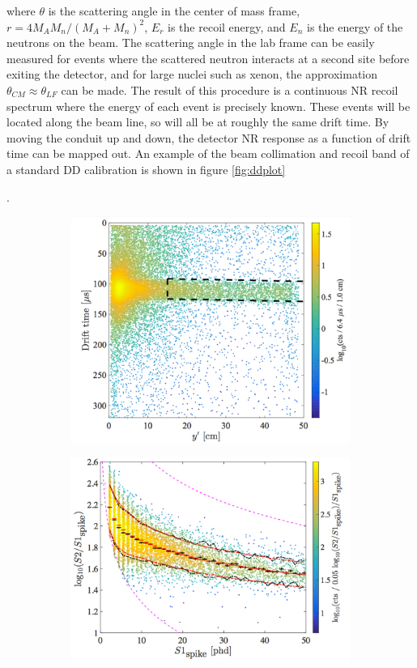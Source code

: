 where $\theta$ is the scattering angle in the center of mass frame, $r=4M_AM_n/(M_A+M_n)^2$, $E_r$ is the recoil energy, and $E_n$ is the energy of the neutrons on the beam. The scattering angle in the lab frame can be easily measured for events where the scattered neutron interacts at a second site before exiting the detector, and for large nuclei such as xenon, the approximation $\theta_{CM}\approx \theta_{LF}$ can be made. The result of this procedure is a continuous NR recoil spectrum where the energy of each event is precisely known. These events will be located along the beam line, so will all be at roughly the same drift time. By moving the conduit up and down, the detector NR response as a function of drift time can be mapped out. An example of the beam collimation and recoil band of a standard DD calibration is shown in figure \ref{fig:ddplot}{\cite{lux_dd1,lux_dd2}.
\begin{figure}[h!]
\centering
\begin{subfigure}{0.5\textwidth}
  \centering
  \includegraphics[width=\textwidth]{Figures/DDbeam.pdf}
\end{subfigure}%
\begin{subfigure}{0.5\textwidth}
  \centering
  \includegraphics[width=\textwidth]{Figures/DDband.pdf}

\end{subfigure}
\end{figure}}
